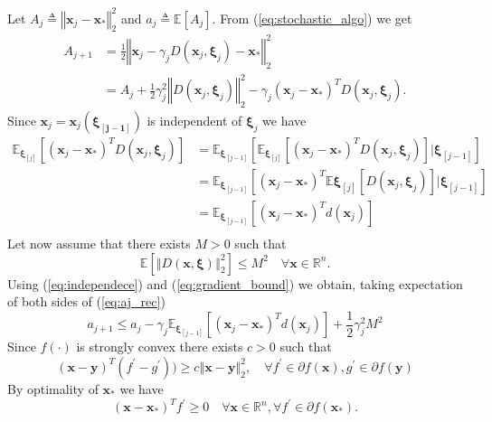 \documentclass{article}
\renewcommand{\vec}[1]{\boldsymbol{#1}}
\newcommand{\norm}[1]{\left\Vert #1 \right\Vert}
\newcommand{\defeq}{\triangleq}
\begin{document}
Let $A_j\defeq \norm{\vec{x}_j-\vec{x}_*}^2_2$ and $a_j\defeq\mathbb{E}[A_j]$.
From (\ref*{eq:stochastic_algo}) we get
\begin{equation}
\begin{aligned}
	A_{j+1} &= \frac{1}{2}\norm{\vec{x}_j - \gamma_jD(\vec{x}_j,\vec{\xi}_j) -\vec{x}_*}^2_2\\ 
	&= A_j +\frac{1}{2}\gamma_j^2\norm{D(\vec{x}_j,\vec{\xi}_j)}^2_2 - \gamma_j(\vec{x}_j-\vec{x}_*)^TD(\vec{x}_j,\vec{\xi}_j).
\end{aligned}
\label{eq:aj_rec}
\end{equation}
Since $\vec{x}_j = \vec{x}_j(\vec{\xi_{[j-1]}})$ is independent of $\vec{\xi}_j$ we have
\begin{equation}
\begin{aligned}
	\mathbb{E}_{\vec{\xi}_{[j]}}[(\vec{x}_j-\vec{x}_*)^TD(\vec{x}_j,\vec{\xi}_j)] &= \mathbb{E}_{\vec{\xi}_{[j-1]}}[\mathbb{E}_{\vec{\xi}_{[j]}}[(\vec{x}_j-\vec{x}_*)^TD(\vec{x}_j,\vec{\xi}_j)]|\vec{\xi}_{[j-1]}]\\
	&= \mathbb{E}_{\vec{\xi}_{[j-1]}}[(\vec{x}_j-\vec{x}_*)^T\mathbb{E}{\vec{\xi}_{[j]}}[D(\vec{x}_j,\vec{\xi}_j)]|\vec{\xi}_{[j-1]}]\\
	&=\mathbb{E}_{\vec{\xi}_{[j-1]}}[(\vec{x}_j-\vec{x}_*)^Td(\vec{x}_j)]\\
\end{aligned}
\label{eq:independece}
\end{equation}
Let now assume that there exists $M>0$ such that
\begin{equation}
	\mathbb{E}[\norm{D(\vec{x},\vec{\xi})}^2_2]\leq M^2 \quad \forall \vec{x} \in \mathbb{R}^n.
	\label{eq:gradient_bound}
\end{equation}
Using (\ref{eq:independece}) and (\ref{eq:gradient_bound}) we obtain, taking expectation of both sides of (\ref{eq:aj_rec})
\begin{equation}
	a_{j+1} \leq a_j - \gamma_j\mathbb{E}_{\vec{\xi}_{[j-1]}}[(\vec{x}_j-\vec{x}_*)^Td(\vec{x}_j)] + \frac{1}{2}\gamma_j^2M^2
	\label{eq:aj_rec_2}
\end{equation}
Since $f(\cdot)$ is strongly convex there exists $c>0$ such that
\begin{equation}
	(\vec{x}-\vec{y})^T(f^\prime- g^\prime))\geq c \norm{\vec{x}-\vec{y}}^2_2, \quad \forall f^\prime\in\partial f(\vec{x}), g^\prime\in\partial f(\vec{y})
	\label{eq:strong_convexity}
\end{equation}
By optimality of $\vec{x}_*$ we have
\begin{equation}
	(\vec{x}-\vec{x}_*)^T f^\prime \geq 0 \quad \forall \vec{x} \in \mathbb{R}^n, \forall f^\prime\in\partial f(\vec{x}_*).
	\label{eq:optimality}
\end{equation}
\end{document}
